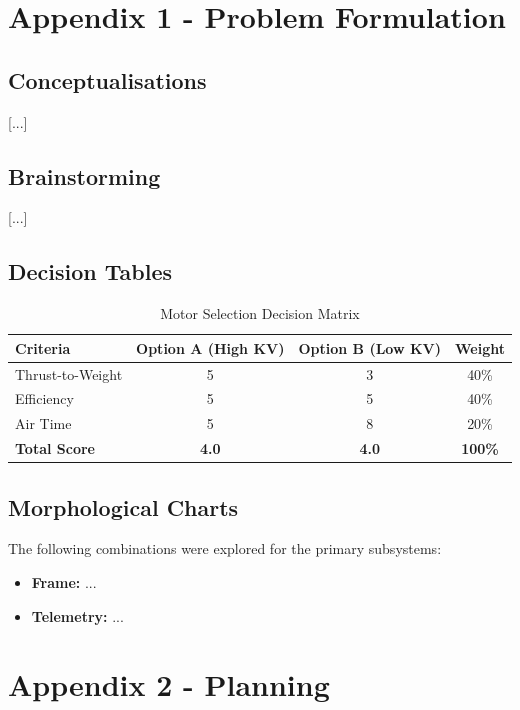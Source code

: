 \documentclass[journal, onecolumn]{IEEEtran}
\begin{document}
\newpage

\newpage
\section{Appendix 1 - Problem Formulation}

\subsection{Conceptualisations}
[...]

\subsection{Brainstorming}
[...]

\subsection{Decision Tables}
\begin{table}[H]
    \centering
    \begin{tabular}{|l|c|c|c|}
        \hline
        \textbf{Criteria} & \textbf{Option A (High KV)} & \textbf{Option B (Low KV)} & \textbf{Weight} \\ \hline
        Thrust-to-Weight & 5 & 3 & 40\% \\ \hline
        Efficiency & 5 & 5 & 40\% \\ \hline
        Air Time & 5 & 8 & 20\% \\ \hline
        \textbf{Total Score} & \textbf{4.0} & \textbf{4.0} & \textbf{100\%} \\ \hline
    \end{tabular}
    \caption{Motor Selection Decision Matrix}
\end{table}

\subsection{Morphological Charts}
The following combinations were explored for the primary subsystems:
\begin{itemize}
    \item \textbf{Frame:} ...
    \item \textbf{Telemetry:} ...
\end{itemize}

\newpage
\section{Appendix 2 - Planning}
\end{document}
